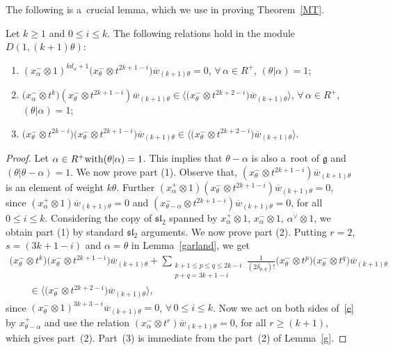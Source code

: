 \documentclass[pdftex]{sigma}
\numberwithin{equation}{section}
\begin{document}
The following is a~crucial lemma, which we use in proving Theorem~\ref{MT}.
\begin{lemma}
\label{crucial}
Let $k\geq 1$ and $0\leq i \leq k$. The following relations hold in the module $D(1,(k+1)\theta)$:
\begin{enumerate}\itemsep=0pt
\item[$1)$] $(x^{-}_{\alpha} \otimes 1)^{kd_{\alpha}+1}\big(x^{-}_{\theta} \otimes t^{2k+1-i}\big) \overline{w}_{(k+1)\theta}=0$,
$\forall\, \alpha \in R^{+}$, $(\theta|\alpha)=1$;
\item[$2)$] $\big(x^{-}_{\alpha} \otimes t^{k}\big) (x^{-}_{\theta} \otimes t^{2k+1-i}) \overline{w}_{(k+1)\theta} \in
\big\langle \big(x^{-}_{\theta} \otimes t^{2k+2-i}\big) \overline{w}_{(k+1)\theta} \big\rangle$,
$\forall\, \alpha \in R^{+}$, $(\theta|\alpha)=1$;
\item[$3)$] $\big(x^{-}_{\theta} \otimes t^{2k-i}\big) \big(x^{-}_{\theta} \otimes t^{2k+1-i}\big) \overline{w}_{(k+1)\theta}
\in
\big\langle \big(x^{-}_{\theta} \otimes t^{2k+2-i}\big) \overline{w}_{(k+1)\theta} \big\rangle$.
\end{enumerate}
\end{lemma}
\begin{proof}
Let $ \alpha \in R^{+} \textup{with} (\theta|\alpha)=1$. This implies that $\theta-\alpha$ is also a~root of
$\mathfrak{g}$ and $(\theta|\theta-\alpha)=1$. We now prove part (1).
Observe that, $(x^{-}_{\theta} \otimes t^{2k+1-i}) \overline{w}_{(k+1)\theta}$ is an element of weight $k\theta$.
Further $(x^{+}_{\alpha} \otimes 1) (x^{-}_{\theta} \otimes t^{2k+1-i}) \overline{w}_{(k+1)\theta}=0$, since
$(x^{+}_{\alpha} \otimes 1)\overline{w}_{(k+1)\theta}=0$ and $(x^{-}_{\theta-\alpha} \otimes t^{2k+1-i}) \overline{w}_{(k+1)\theta}=0$,
for all $0\leq i \leq k$.
Considering the copy of $\mathfrak{sl}_2$ spanned by $x^{+}_{\alpha} \otimes 1$, $x^{-}_{\alpha} \otimes 1$,
$\alpha^{\vee}\otimes 1$, we obtain part (1) by standard $\mathfrak{sl}_2$ arguments.
We now prove part (2).
Putting $r=2$, $s=(3k+1-i)$ and $\alpha=\theta$ in Lemma~\ref{garland}, we get
\begin{gather}
\big(x^{-}_{\theta} \otimes t^{k}\big) \big(x^{-}_{\theta} \otimes t^{2k+1-i}\big) \overline{w}_{(k+1)\theta} +
\sum\limits_{\substack{k+1\leq p\leq q \leq 2k-i\\p+q= 3k+1-i}}
\frac{1}{(2\delta_{p, q})!} \big(x^{-}_{\theta} \otimes t^{p}\big) \big(x^{-}_{\theta} \otimes t^{q}\big)
\overline{w}_{(k+1)\theta}
\nonumber\\
\qquad{}
\in
\big\langle\big(x^{-}_{\theta}\otimes t^{2k+2-i}\big) \overline{w}_{(k+1)\theta} \big\rangle, \label{e}
\end{gather}
since $(x^{-}_{\theta}\otimes 1)^{3k+3-i}\overline{w}_{(k+1)\theta}=0$, $\forall\, 0\leq i \leq k$.
Now we act on both sides of~\eqref{e} by $x^{+}_{\theta-\alpha}$ and use the relation $(x^{-}_{\alpha} \otimes t^r) \overline{w}_{(k+1)\theta}=0$,
for all $r\geq(k+1)$, which gives part~(2).
Part~(3) is immediate from the part~(2) of Lemma~\ref{g}.
\end{proof}
\end{document}
